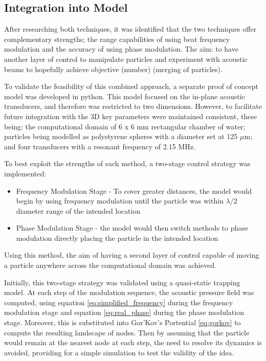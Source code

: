 \documentclass[11pt,a4paper]{article}
\begin{document}
\subsection{Integration into Model}
\label{Phase_and_freq_model}
After researching both techniques, it was identified that the two techniques offer complementary strengths; the range capabilities of using beat frequency modulation and the accuracy of using phase modulation. The aim: to have another layer of control to manipulate particles and experiment with acoustic beams to hopefully achieve objective (number) (merging of particles). 

To validate the feasibility of this combined approach, a separate proof of concept model was developed in python. This model focused on the in-plane acoustic transducers, and therefore was restricted to two dimensions. However, to facilitate future integration with the 3D key parameters were maintained consistent, these being: the computational domain of 6 x 6 mm rectangular chamber of water; particles being modelled as polystyrene spheres with a diameter set at 125 $\mu$m; and four transducers with a resonant frequency of 2.15 MHz. 

To best exploit the strengths of each method, a two-stage control strategy was implemented:
\begin{itemize}
    \item Frequency Modulation Stage - To cover greater distances, the model would begin by using frequency modulation until the particle was within $\lambda/2$ diameter range of the intended location
    \item Phase Modulation Stage -  the model would then switch methods to phase modulation directly placing the particle in the intended location
\end{itemize}
Using this method, the aim of having a second layer of control capable of moving a particle anywhere across the computational domain was achieved.

Initially, this two-stage strategy was validated using a quasi-static trapping model. At each step of the modulation sequence, the acoustic pressure field was computed, using equation \ref{eq:simplified_frequency} during the frequency modulation stage and equation \ref{eq:real_phase} during the phase modulation stage. Moreover, this is substituted into Gor'Kov's Portential \ref{eq:gorkov} to compute the resulting landscape of nodes. Then by assuming that the particle would remain at the nearest node at each step, the need to resolve its dynamics is avoided, providing for a simple simulation to test the validity of the idea. 
\end{document}

